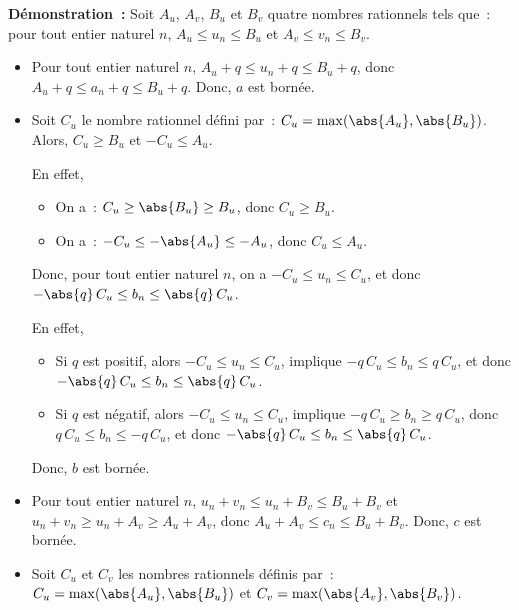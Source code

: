 \noindent\textbf{Démonstration :}
    Soit $A_u$, $A_v$, $B_u$ et $B_v$ quatre nombres rationnels tels que~: pour tout entier naturel $n$, $A_u \leq u_n \leq B_u$ et $A_v \leq v_n \leq B_v$.
    \begin{itemize}[nosep]
        \item Pour tout entier naturel $n$, $A_u + q \leq u_n + q \leq B_u + q$, donc $A_u + q \leq a_n + q \leq B_u + q$.
            Donc, $a$ est bornée.
        \item Soit $C_u$ le nombre rationnel défini par : $C_u = \mathrm{max}(\abs{A_u}, \abs{B_u})$.
            Alors, $C_u \geq B_u$ et $-C_u \leq A_u$.%
            \begin{foot}
                En effet, 
                \begin{itemize}[nosep]
                    \item On a~: $C_u \geq \abs{B_u} \geq B_u$, donc $C_u \geq B_u$.
                    \item On a~: $-C_u \leq -\abs{A_u} \leq -A_u$, donc $C_u \leq A_u$.
                \end{itemize}
            \end{foot} 
            Donc, pour tout entier naturel $n$, on a $-C_u \leq u_n \leq C_u$, et donc $- \abs{q} \, C_u \leq b_n \leq \abs{q} \, C_u$.%
            \begin{foot}
                En effet, 
                \begin{itemize}
                    \item Si $q$ est positif, alors $-C_u \leq u_n \leq C_u$, implique $- q \, C_u \leq b_n \leq q \, C_u$, et donc $- \abs{q} \, C_u \leq b_n \leq \abs{q} \, C_u$. 
                    \item Si $q$ est négatif, alors $-C_u \leq u_n \leq C_u$, implique $- q \, C_u \geq b_n \geq q \, C_u$, donc $q \, C_u \leq b_n \leq -q \, C_u$, et donc $- \abs{q} \, C_u \leq b_n \leq \abs{q} \, C_u$. 
                \end{itemize}
            \end{foot}
            Donc, $b$ est bornée.
        \item Pour tout entier naturel $n$, $u_n + v_n \leq u_n + B_v \leq B_u + B_v$ et $u_n + v_n \geq u_n + A_v \geq A_u + A_v$, donc $A_u + A_v \leq c_n \leq B_u + B_v$. 
            Donc, $c$ est bornée.
        \item Soit $C_u$ et $C_v$ les nombres rationnels définis par : $C_u = \mathrm{max}(\abs{A_u}, \abs{B_u})$ et $C_v = \mathrm{max}(\abs{A_v}, \abs{B_v})$.

\end{itemize}
